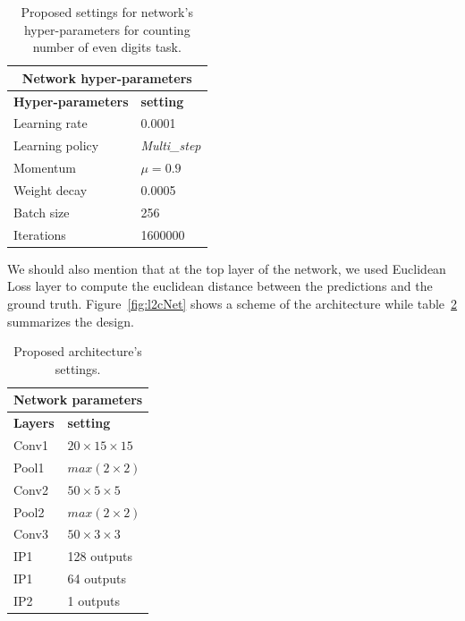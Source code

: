 \begin{table}[H]
	\centering
	\begin{tabular}{ |p{3.8cm}|p{1.7cm}| }
	\hline 
	\multicolumn{2}{|c|}{\textbf{Network hyper-parameters}} \\
	\hline
	\hline
	\textbf{Hyper-parameters} & \textbf{setting }\\
	\hline
	Learning rate & 0.0001\\
	\hline
	Learning policy    & \textit{Multi\_step} \\
	\hline
	Momentum & $\mu = 0.9$\\
	\hline
	Weight decay & 0.0005 \\
	\hline
	Batch size & 256 \\
	\hline
	Iterations & 1600000 \\
	\hline
	\end{tabular}
		\caption{Proposed settings for network's hyper-parameters for counting number of even digits task.}
		\label{hypers}
\end{table}
 

\noindent We should also mention that at the top layer of the network, we used Euclidean Loss layer to compute the euclidean distance between the predictions and the ground truth.  Figure~\ref{fig:l2cNet} shows a scheme of the architecture while table~\ref{ourltc} summarizes the design. 
		\begin{table}[H]
			\centering
			\begin{tabular}{ |p{2cm}|p{2cm}| }
			\hline 
			\multicolumn{2}{|c|}{\textbf{Network parameters}} \\
			\hline
			\hline
			\textbf{Layers} & \textbf{setting }\\
			\hline
			Conv1 & $20\times15\times15$\\
			\hline
			Pool1    & $max(2\times2)$ \\
			\hline
			Conv2 & $50\times5\times5$\\
			\hline
			Pool2    & $max(2\times2)$ \\
			\hline
			Conv3 & $50\times3\times3$\\
			\hline
			IP1 & 128 outputs \\
			\hline
			IP1 & 64 outputs \\
			\hline
			IP2 & 1 outputs \\
			\hline
			\end{tabular}
				\caption{Proposed architecture's settings.}
				\label{ourltc}
		\end{table}
		 
